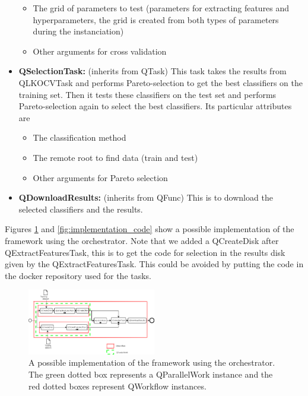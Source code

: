 \documentclass[10pt, conference, compsocconf]{IEEEtran}
\begin{document}
\begin{itemize}
\begin{itemize}
  \item The grid of parameters to test (parameters for extracting features and hyperparameters, the grid is created from both types of parameters during the instanciation)
  \item Other arguments for cross validation
  \end{itemize}
\item \textbf{QSelectionTask:} (inherits from QTask) This task takes the results from QLKOCVTask and performs Pareto-selection to get the best classifiers on the training set. Then it tests these classifiers on the test set and performs Pareto-selection again to select the best classifiers.
  Its particular attributes are
  \begin{itemize}
  \item The classification method
  \item The remote root to find data (train and test)
  \item Other arguments for Pareto selection
  \end{itemize}
\item \textbf{QDownloadResults:} (inherits from QFunc) This is to download the selected classifiers and the results.
\end{itemize}
Figures \ref{fig:implementation_diagram} and \ref{fig:implementation_code} show a possible implementation of the framework using the orchestrator. Note that we added a QCreateDisk after QExtractFeaturesTask, this is to get the code for selection in the results disk given by the QExtractFeaturesTask. This could be avoided by putting the code in the docker repository used for the tasks.
\begin{figure}[h]
\centering
\includegraphics[width=0.5\textwidth]{Figures/implementation.png}
\caption{A possible implementation of the framework using the orchestrator. The green dotted box represents a QParallelWork instance and the red dotted boxes represent QWorkflow instances.}
\label{fig:implementation_diagram}
\end{figure}
\begin{mdframed}[backgroundcolor=LightGray,topline=false, bottomline=false,leftline=false, rightline=false]
\inputminted[baselinestretch=1, fontsize=\scriptsize]{python}{selection.py}
\end{mdframed}
\label{fig:implementation_code}
\end{document}
